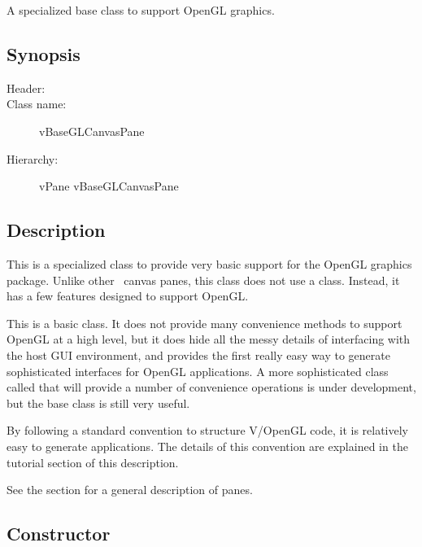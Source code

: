 

A specialized base class to support OpenGL graphics.

\subsection* {Synopsis}

\begin{description}
	\item [Header:] 
	\item [Class name:] vBaseGLCanvasPane
 	\item [Hierarchy:] vPane \rta vBaseGLCanvasPane
\end{description}

\subsection* {Description}

This is a specialized class to provide very basic support
for the OpenGL graphics package. Unlike other \V\ canvas
panes, this class does not use a  class. Instead,
it has a few features designed to support OpenGL.

This is a basic class. It does not provide many convenience
methods to support OpenGL at a high level, but it does hide
all the messy details of interfacing with the host GUI
environment, and provides the first really easy way to
generate sophisticated interfaces for OpenGL applications.
A more sophisticated class
called  that will provide a number
of convenience operations is under development, but the
base class is still very useful.

By following a standard convention to structure V/OpenGL
code, it is relatively easy to generate applications.
The details of this convention are explained in the tutorial
section of this description.

See the section  for a general description of panes.

\subsection* {Constructor} %

